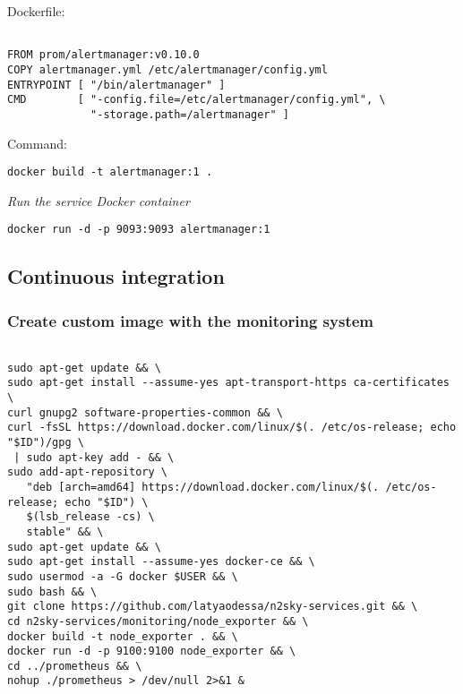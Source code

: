 Dockerfile:
 \begin{lstlisting}

FROM prom/alertmanager:v0.10.0
COPY alertmanager.yml /etc/alertmanager/config.yml
ENTRYPOINT [ "/bin/alertmanager" ]
CMD        [ "-config.file=/etc/alertmanager/config.yml", \
             "-storage.path=/alertmanager" ]

\end{lstlisting}

Command: 

 \begin{lstlisting}
docker build -t alertmanager:1 .
\end{lstlisting}


\emph{Run the service Docker container}
 \begin{lstlisting}
docker run -d -p 9093:9093 alertmanager:1
\end{lstlisting}



\subsection{Continuous integration}\label{Continuous integration}

\subsubsection{Create custom image with the monitoring system}\label{Custom image with the monitoring system}

 \begin{lstlisting}

sudo apt-get update && \
sudo apt-get install --assume-yes apt-transport-https ca-certificates \
curl gnupg2 software-properties-common && \
curl -fsSL https://download.docker.com/linux/$(. /etc/os-release; echo "$ID")/gpg \
 | sudo apt-key add - && \
sudo add-apt-repository \
   "deb [arch=amd64] https://download.docker.com/linux/$(. /etc/os-release; echo "$ID") \
   $(lsb_release -cs) \
   stable" && \
sudo apt-get update && \
sudo apt-get install --assume-yes docker-ce && \
sudo usermod -a -G docker $USER && \
sudo bash && \
git clone https://github.com/latyaodessa/n2sky-services.git && \
cd n2sky-services/monitoring/node_exporter && \
docker build -t node_exporter . && \
docker run -d -p 9100:9100 node_exporter && \
cd ../prometheus && \
nohup ./prometheus > /dev/null 2>&1 &

\end{lstlisting}


